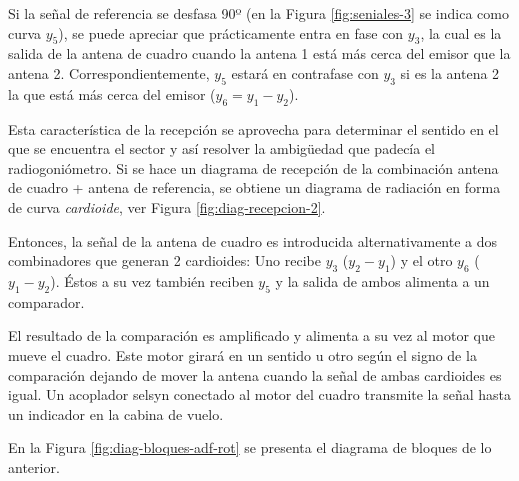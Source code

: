 Si la se\~nal de referencia se desfasa 90º (en la Figura \ref{fig:seniales-3} se indica como curva $y_5$), se puede apreciar que pr\'acticamente entra en fase con $y_3$, la cual es la salida de la antena de cuadro cuando la antena 1 est\'a m\'as cerca del emisor que la antena 2. Correspondientemente, $y_5$ estar\'a en contrafase con $y_3$ si es la antena 2 la que est\'a m\'as cerca del emisor ($y_6 = y_1 - y_2$). %

Esta caracter\'istica de la recepci\'on se aprovecha para determinar el sentido en el que se encuentra el sector y as\'i resolver la ambigüedad que padec\'ia el radiogoni\'ometro. Si se hace un diagrama de recepci\'on de la combinaci\'on antena de cuadro + antena de referencia, se obtiene un diagrama de radiaci\'on en forma de curva \emph{cardioide}, ver Figura \ref{fig:diag-recepcion-2}.


Entonces, la se\~nal de la antena de cuadro es introducida alternativamente a dos combinadores que generan 2 cardioides: Uno recibe $y_3$ ($y_2-y_1$) y el otro $y_6$ ($y_1-y_2$). \'Estos a su vez tambi\'en reciben $y_5$ y la salida de ambos alimenta a un comparador.

El resultado de la comparaci\'on es amplificado y alimenta a su vez al motor que mueve el cuadro. Este motor girar\'a en un sentido u otro seg\'un el signo de la comparaci\'on dejando de mover la antena cuando la se\~nal de ambas cardioides es igual. Un acoplador selsyn conectado al motor del cuadro transmite la se\~nal hasta un indicador en la cabina de vuelo.

En la Figura \ref{fig:diag-bloques-adf-rot} se presenta el diagrama de bloques de lo anterior.



 
